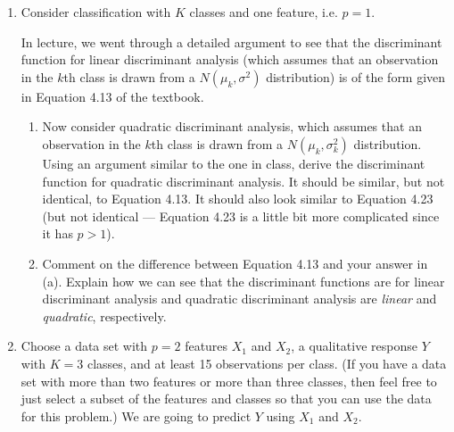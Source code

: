 \documentclass[12pt]{article}
\begin{document}
\begin{enumerate}


\item  Consider classification with $K$ classes and one feature, i.e. $p=1$. 

In lecture, we went through a detailed argument to see that the discriminant function for linear discriminant analysis (which assumes that an observation in the $k$th class is drawn from a $N(\mu_k, \sigma^2)$ distribution) is of the form given in Equation 4.13 of the textbook. %

\begin{enumerate}

\item Now consider quadratic discriminant analysis, which assumes that an observation in the $k$th class is drawn from a $N(\mu_k, \sigma_k^2)$ distribution. Using an argument similar to the one in class, derive the discriminant function for quadratic discriminant analysis. It should be similar, but not identical, to Equation 4.13.  It should also look similar to Equation 4.23 (but not identical ---  Equation 4.23 is a little bit more complicated since it has $p>1$). 

\item Comment on the difference between Equation 4.13 and your answer in (a). Explain how we can see that the discriminant functions are for linear discriminant analysis and quadratic discriminant analysis are  \emph{linear} and \emph{quadratic}, respectively. 


\end{enumerate}


\item Choose a  data set with $p=2$ features $X_1$ and $X_2$,  a qualitative response  $Y$ with $K = 3$ classes, and at least 15 observations per class. (If you have a data set with more than two features or more than three classes, then feel free to just select a subset of the features and classes so that you can use the data for this problem.) We are going to predict $Y$ using $X_1$ and $X_2$. 




\end{enumerate}
\end{document}
